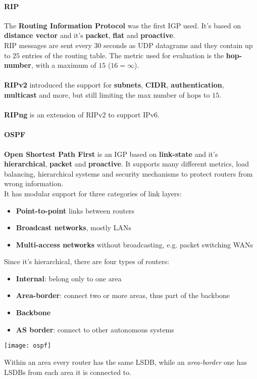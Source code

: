 \paragraph{RIP} The \textbf{Routing Information Protocol} was the first IGP used. It's based on \textbf{distance vector} and it's \textbf{packet}, \textbf{flat} and \textbf{proactive}.\\
RIP messages are sent every $30$ seconds as UDP datagrams and they contain up to $25$ entries of the routing table. The metric used for evaluation is the \textbf{hop-number}, with a maximum of $15$ ($16 = \infty$).\\\\
\textbf{RIPv2} introduced the support for \textbf{subnets}, \textbf{CIDR}, \textbf{authentication}, \textbf{multicast} and more, but still limiting the max number of hops to $15$.\\\\
\textbf{RIPng} is an extension of RIPv2 to support IPv6.

\paragraph{OSPF} \textbf{Open Shortest Path First} is an IGP based on \textbf{link-state} and it's \textbf{hierarchical}, \textbf{packet} and \textbf{proactive}. It supports many different metrics, load balancing, hierarchical systems and security mechanisms to protect routers from wrong information.\\
It has modular support for three categories of link layers:
\begin{itemize}
	\item \textbf{Point-to-point} links between routers
	\item \textbf{Broadcast networks}, mostly LANs
	\item \textbf{Multi-access networks} without broadcasting, e.g. packet switching WANs
\end{itemize}
Since it's hierarchical, there are four types of routers:
\begin{itemize}
	\item \textbf{Internal}: belong only to one area
	\item \textbf{Area-border}: connect two or more areas, thus part of the backbone
	\item \textbf{Backbone}
	\item \textbf{AS border}: connect to other autonomous systems
\end{itemize}
\begin{center}
	\texttt{[image: ospf]}
\end{center}
Within an area every router has the same LSDB, while an \textit{area-border} one has LSDBs from each area it is connected to.

